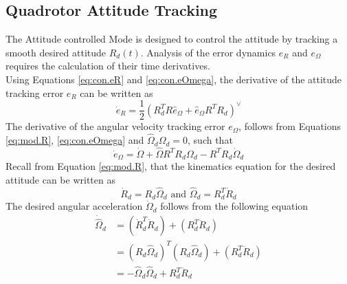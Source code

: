 
\subsection{Quadrotor Attitude Tracking}\label{sec:con.qratt}
The  Attitude controlled Mode is designed to control the  attitude by tracking a smooth desired  attitude $ R_d(t) $.  
Analysis of the error dynamics $ e_R $ and $ e_\Omega $ requires the calculation of their time derivatives.\\
Using Equations \ref{eq:con.eR} and \ref{eq:con.eOmega}, the derivative of the attitude tracking error $ e_R $ can be written as
\begin{equation}\label{key}
\dot{e}_R=\frac{1}{2}(R_d^TR\hat{e}_\Omega+\hat{e}_\Omega R^TR_d)^\vee
\end{equation}
The derivative of the angular velocity tracking error $ e_\Omega $, follows from Equations \ref{eq:mod.R}, \ref{eq:con.eOmega} and $ \hat{\Omega}_d\Omega_d =0$, such that
\begin{equation}\label{eq:con.deOmega}
\dot{e}_\Omega=\dot{\Omega}+\hat{\Omega}R^TR_d\Omega_d-R^TR_d\dot{\Omega}_d
\end{equation}
Recall from Equation \ref{eq:mod.R}, that the kinematics equation for the desired attitude can be written as
\begin{equation}\label{eq:con.dotRd}
\dot{R}_d=R_d\hat{\Omega}_d \text{ and } \hat{\Omega}_d=R_d^T\dot{R}_d
\end{equation}
The desired angular acceleration $ \dot{\Omega}_d $ follows from the following equation
\begin{equation}
\begin{aligned}
\dot{\hat{\Omega}}_d&=(\dot{R}_d^T\dot{R}_d)+(R_d^T\ddot{R}_d)\\
&=(R_d\hat{\Omega}_d)^T(R_d\hat{\Omega}_d)+(R_d^T\ddot{R}_d)\\
&=-\hat{\Omega}_d\hat{\Omega}_d+R_d^T\ddot{R}_d
\end{aligned}
\end{equation}
